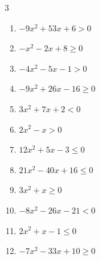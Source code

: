 \begin{multicols}{3}
\begin{enumerate}
  \item $-9x^{2}+53x+6>0$


  \item $-x^{2}-2x+8\geq 0$

        \phantom{$\displaystyle -4 \leqq x \leqq 2$}

  \item $-4x^{2}-5x-1>0$


\columnbreak %

\resetques

  \item $-9x^{2}+26x-16\geq 0$


  \item $3x^{2}+7x+2<0$


  \item $2x^{2}-x>0$


  \item $12x^{2}+5x-3\leq 0$


  \item $21x^{2}-40x+16\leq 0$


  \item $3x^{2}+x\geq 0$


  \item $-8x^{2}-26x-21<0$


  \item $2x^{2}+x-1\leq 0$


  \item $-7x^{2}-33x+10\geq 0$



\end{enumerate}
\end{multicols}
